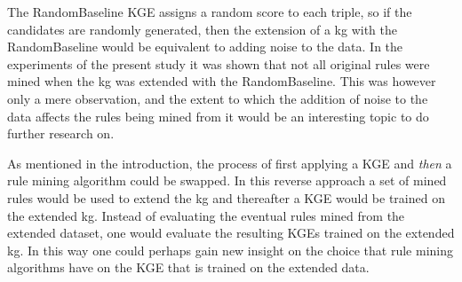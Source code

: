 The RandomBaseline KGE assigns a random score to each triple, so if the candidates are randomly generated, then the extension of a \gls{kg} with the RandomBaseline would be equivalent to adding noise to the data. In the experiments of the present study it was shown that not all original rules were mined when the \gls{kg} was extended with the RandomBaseline. This was however only a mere observation, and the extent to which the addition of noise to the data affects the rules being mined from it would be an interesting topic to do further research on.

As mentioned in the introduction, the process of first applying a KGE and \textit{then} a rule mining algorithm could be swapped. In this reverse approach a set of mined rules would be used to extend the \gls{kg} and thereafter a KGE would be trained on the extended \gls{kg}. Instead of evaluating the eventual rules mined from the extended dataset, one would evaluate the resulting KGEs trained on the extended \gls{kg}. In this way one could perhaps gain new insight on the choice that rule mining algorithms have on the KGE that is trained on the extended data.